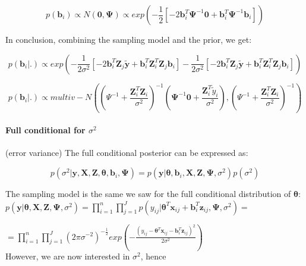 \documentclass[a4paper]{article}
\begin{document}
\begin{equation}
p(\bm{b}_{i}) \propto N(\bm{0}, \bm{\Psi}) \propto exp(-\frac{1}{2}[-2\bm{b}_{i}^{T}\bm{\Psi}^{-1}\bm{0} + \bm{b}_{i}^{T}\bm{\Psi}^{-1}\bm{b}_{i}])
\end{equation}

In conclusion, combining the sampling model and the prior, we get:

\begin{equation}
	p(\bm{b}_{i}|.) \propto 	
	exp(
	-\frac{1}{2\sigma^2}[- 2\bm{b}_{i}^{T}\bm{Z}_{j}\tilde{\bm{y}} + \bm{b}_{i}^{T}\bm{Z}^{T}_{i} \bm{Z}_{j}\bm{b}_{i}]
	-\frac{1}{2\sigma^2}[- 2\bm{b}_{i}^{T}\bm{Z}_{j}\tilde{\bm{y}} + \bm{b}_{i}^{T}\bm{Z}^{T}_{i} \bm{Z}_{j}\bm{b}_{i}]) 
\end{equation}

\begin{equation}
	p(\bm{b}_{i}|.) 	\propto 	multiv-N((\Psi^{-1} + \frac{\bm{Z}_{i}^{T}\bm{Z}_{i}}{\sigma^2})^{-1}(\bm{\Psi}^{-1}\bm{0}+\frac{\bm{Z}_{i}^{T}\tilde{y}_{i}}{\sigma^2}), (\Psi^{-1} + \frac{\bm{Z}_{i}^{T}\bm{Z}_{i}}{\sigma^2})^{-1})	
\end{equation}


\paragraph{Full conditional for $\sigma^2$}(error variance)
The full conditional posterior can be expressed as:

\begin{equation}
	p(\sigma^2|\bm{y}, \bm{X}, \bm{Z}, \bm{\theta}, \bm{b}_{i}, \bm{\Psi}) = 	p(\bm{y}|\bm{\theta}, \bm{b}_{i}, \bm{X}, \bm{Z}, \bm{\Psi}, \sigma^2) p(\sigma^2)
\end{equation}

The sampling model is the same we saw for the full conditional distribution of $\bm{\theta}$:\\

$p(\bm{y}|\bm{\theta}, \bm{X}, \bm{Z}, \bm{\Psi}, \sigma^2) = \prod_{i=1}^n \prod_{j=1}^Jp(y_{ij}|\bm{\theta}^{T}\bm{x}_{ij} + \bm{b}_{i}^{T}\bm{z}_{ij}, \bm{\Psi}, \sigma^2)=$

$ = \prod_{i=1}^{n} \prod_{j=1}^{J}(2\pi\sigma^{-2})^{-\frac{1}{2}}exp(-\frac{(y_{ij} - \bm{\theta}^{T}\bm{x}_{ij} - \bm{b}_{i}^{T}\bm{z}_{ij})^2}{2\sigma^2})$\\

However, we are now interested in $\sigma^2$, hence\\
\end{document}
